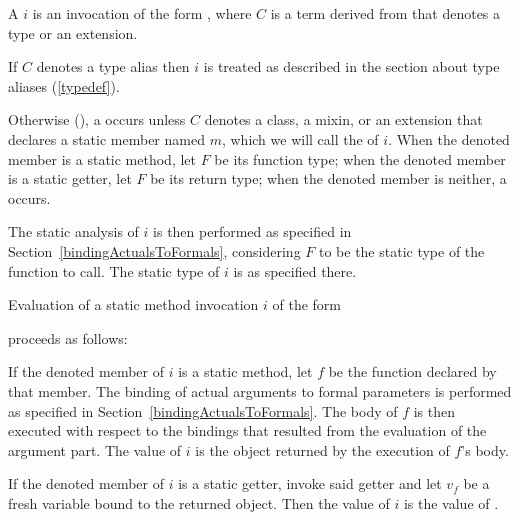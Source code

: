 \documentclass[makeidx]{article}
\begin{document}
{\LMHash{}%
A 
$i$ is an invocation of the form
,
where $C$ is a term derived from 
that denotes a type or an extension.


\LMHash{}%
If $C$ denotes a type alias then $i$ is treated as described in
the section about type aliases
(\ref{typedef}).

\LMHash{}%
Otherwise
(),
a  occurs
unless $C$ denotes a class, a mixin, or an extension that declares
a static member named $m$,
which we will call the
of $i$.
When the denoted member is a static method, let $F$ be its function type;
when the denoted member is a static getter, let $F$ be its return type;
when the denoted member is neither, a  occurs.

\LMHash{}%
The static analysis of $i$ is then performed
as specified in Section~\ref{bindingActualsToFormals},
considering $F$ to be the static type of the function to call.
The static type of $i$ is as specified there.

\LMHash{}%
Evaluation of a static method invocation $i$ of the form

\noindent
{}

\noindent
proceeds as follows:

\LMHash{}%
If the denoted member of $i$ is a static method,
let $f$ be the function declared by that member.
The binding of actual arguments to formal parameters is performed
as specified in Section~\ref{bindingActualsToFormals}.
The body of $f$ is then executed with respect to the bindings
that resulted from the evaluation of the argument part.
The value of $i$ is the object returned by the execution of $f$'s body.

\LMHash{}%
If the denoted member of $i$ is a static getter,
invoke said getter and let $v_f$ be
a fresh variable bound to the returned object.
Then the value of $i$ is the value of
.
\EndCase

}
\end{document}
